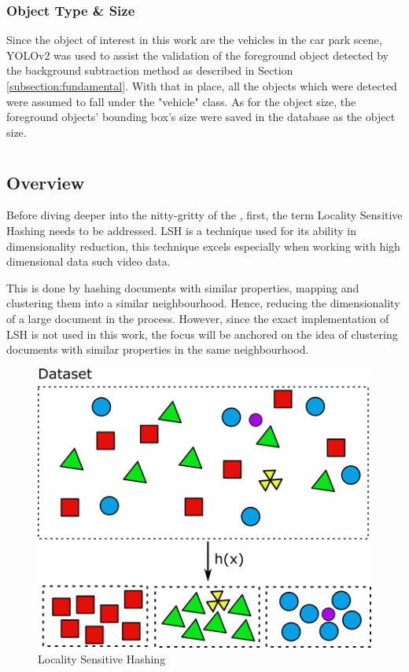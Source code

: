 \subsubsection{Object Type \& Size}
Since the object of interest in this work are the vehicles in the car park scene, YOLOv2 was used to assist the validation of the foreground object detected by the background subtraction method as described in Section \ref{subsection:fundamental}. With that in place, all the objects which were detected were assumed to fall under the "vehicle" class. As for the object size, the foreground objects' bounding box's size were saved in the database as the object size.





\section{\versionOneExt }
\label{section:semantic_lsh}

\subsection{Overview}
Before diving deeper into the nitty-gritty of the \versionOneExt, first, the term Locality Sensitive Hashing needs to be addressed. LSH is a technique used for its ability in dimensionality reduction, this technique excels especially when working with high dimensional data such video data. 

This is done by hashing documents with similar properties, mapping and clustering them into a similar neighbourhood. Hence, reducing the dimensionality of a large document in the process. However, since the exact implementation of LSH is not used in this work, the focus will be anchored on the idea of clustering documents with similar properties in the same neighbourhood. 


\begin{figure}[hbt!]\centering
\includegraphics[width=.7\textwidth]{image/lsh.png}
\caption{Locality Sensitive Hashing}
\label{fig:lshexample}
\end{figure}

